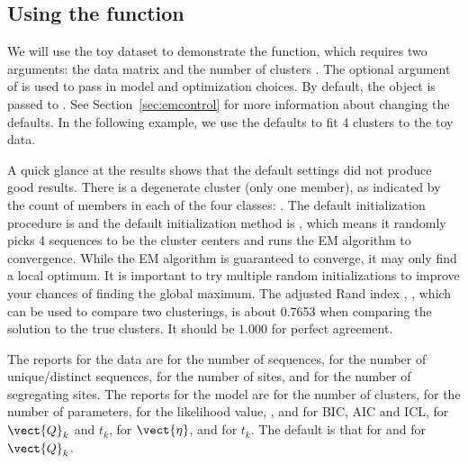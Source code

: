 \subsection[Using the phyclust() function]{Using the  function}
\label{sec:phyclust}

We will use the toy dataset to demonstrate the  function, which requires two arguments: the data matrix  and the number of clusters .
The optional  argument of  is used to pass in model and optimization choices.
By default, the object  is passed to .
See Section~\ref{sec:emcontrol} for more information about changing the defaults.
In the following example, we use the defaults to fit 4 clusters to the
toy data.

A quick glance at the results shows that the default settings did not produce good results.
There is a degenerate cluster (only one member), as indicated by the count of members in each of the four classes: .
The default initialization procedure
is  and the default initialization method is ,
which means it randomly picks 4 sequences to be the cluster centers and
runs the EM algorithm to convergence. While the EM algorithm is guaranteed to converge, it may only find a local optimum.
It is important to try multiple random initializations to improve your chances of finding the global maximum.
The adjusted Rand index \citep{Hubert1985}, , which can be used to compare two clusterings, is about 0.7653 when comparing the  solution to the true clusters.
It should be $1.000$ for perfect agreement.

The reports for the data are
 for the number of sequences,
 for the number of unique/distinct sequences,
 for the number of sites, and
 for the number of segregating sites.
The reports for the model are
 for the number of clusters,
 for the number of parameters,
 for the likelihood value,
,  and  for BIC, AIC and ICL,
 for $_k$ and $t_k$,
 for $\vect{\eta}$, and
 for $t_k$.
The default is that  for  and
 \citep{Jukes1969} for $_k$.

